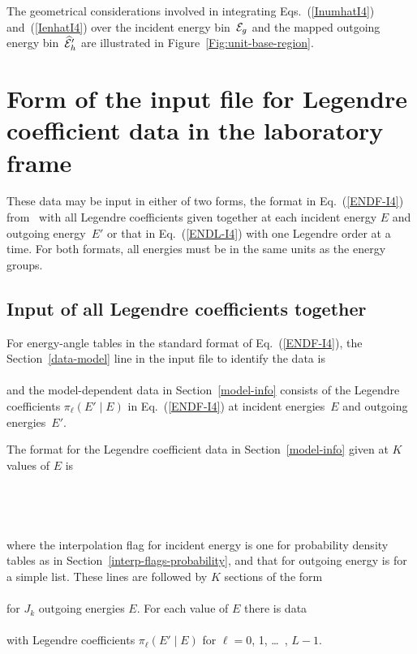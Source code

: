 The geometrical considerations involved in integrating 
Eqs.~(\ref{InumhatI4}) and~(\ref{IenhatI4}) over the incident energy bin~${\cal E}_g$
and the mapped outgoing energy bin~$\widehat{{\cal E}}_h'$ are illustrated
in Figure~\ref{Fig:unit-base-region}.

\section{Form of the input file for Legendre coefficient data in the laboratory frame}
These data may be input in either of two forms, the format 
in Eq.~(\ref{ENDF-I4}) from \ENDF\ with all Legendre
coefficients given together at each incident energy $E$ and outgoing energy~$E'$
or that  in Eq.~(\ref{ENDL-I4}) with
one Legendre order at a time.
For both formats, all energies must be in the same units as the energy groups.

\subsection{Input of all Legendre coefficients together}\label{Sec:ENDF-I4-data}
For energy-angle tables in the standard format of Eq.~(\ref{ENDF-I4}), 
the Section~\ref{data-model} line in the input
file to identify the data is\\
      \\
and the model-dependent data in Section~\ref{model-info} consists of the
Legendre coefficients $\pi_\ell(E' \mid E)$ in Eq.~(\ref{ENDF-I4}) at incident energies~$E$
and outgoing energies~$E'$.

The format for the Legendre coefficient data in
Section~\ref{model-info} given at $K$ values of $E$ is\\
  \\
  \\
  \\
  \\
where the interpolation flag for incident energy is one for probability density
tables as in Section~\ref{interp-flags-probability}, and that for outgoing energy 
is for a simple list.
These lines are followed by $K$ sections of the form\\
  \\
for $J_k$ outgoing energies $E$.  For each value of $E$ there is
data\\
  \\
with Legendre coefficients $\pi_\ell(E' \mid E)$ for $\ell = 0$, 1, \ldots\ , $L - 1$.

